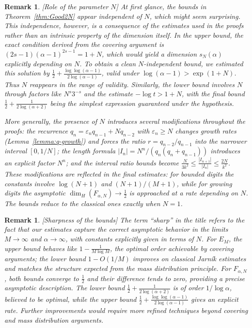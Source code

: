 \documentclass[12pt]{article}
\newtheorem{remark}[theorem]{Remark}
\numberwithin{equation}{section}
\begin{document}
\begin{remark}{[Role of the parameter $N$]
At first glance, the bounds in Theorem~\ref{thm:Good2N} appear independent of $N$, which might seem surprising. This independence, however, is a consequence of the estimates used in the proofs rather than an intrinsic property of the dimension itself. In the upper bound, the exact condition derived from the covering argument is $(2s-1)(\alpha-1)^{2s-1} = 1+N$, which would yield a dimension $s_N(\alpha)$ explicitly depending on $N$. To obtain a clean $N$-independent bound, we estimated this solution by $\frac12 + \frac{\log\log(\alpha-1)}{2\log(\alpha-1)}$, valid under $\log(\alpha-1) > \exp(1+N)$. Thus $N$ reappears in the range of validity. Similarly, the lower bound involves $N$ through factors like $N^s3^{-s}$ and the estimate $-\log t > 1+N$, with the final bound $\frac12 + \frac{1}{2\log(\alpha+2)}$ being the simplest expression guaranteed under the hypothesis.}

{
More generally, the presence of $N$ introduces several modifications throughout the proofs: the recurrence $q_n = \varepsilon_n q_{n-1} + N q_{n-2}$ with $\varepsilon_n \ge N$ changes growth rates (Lemma~\ref{lemma:q-growth}) and forces the ratio $r = q_{n-2}/q_{n-1}$ into the narrower interval $[0,1/N]$; the length formula $|I_n| = N^n/(q_n(q_n+q_{n-1}))$ introduces an explicit factor $N^n$; and the interval ratio bounds become $\frac{N}{3k^2} \le \frac{|I_{n+1}|}{|I_n|} \le \frac{2N}{k^2}$. These modifications are reflected in the final estimates: for bounded digits the constants involve $\log(N+1)$ and $(N+1)/(M+1)$, while for growing digits the asymptotic $\dim_H(F_{\alpha,N}) \to \tfrac12$ is approached at a rate depending on $N$. The bounds reduce to the classical ones exactly when $N=1$.}
\end{remark}

\begin{remark}{[Sharpness of the bounds]
The term ``sharp'' in the title refers to the fact that our estimates capture the correct asymptotic behavior in the limits $M\to\infty$ and $\alpha\to\infty$, with constants explicitly given in terms of $N$. For $E_M$, the upper bound behaves like $1-\frac{1}{M\log M}$, the optimal order achievable by covering arguments; the lower bound $1-O(1/M)$ improves on classical Jarn\'ik estimates and matches the structure expected from the mass distribution principle. For $F_{\alpha,N}$, both bounds converge to $\tfrac12$ and their difference tends to zero, providing a precise asymptotic description. The lower bound $\frac12+\frac{1}{2\log(\alpha+2)}$ is of order $1/\log\alpha$, believed to be optimal, while the upper bound $\frac12+\frac{\log\log(\alpha-1)}{2\log(\alpha-1)}$ gives an explicit rate. Further improvements would require more refined techniques beyond covering and mass distribution arguments.}
\end{remark}
\end{document}
